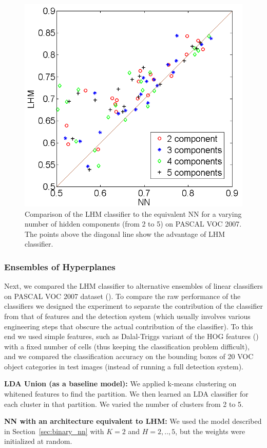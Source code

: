 \documentclass[twoside,11pt]{article}
\begin{document}
\begin{figure}[t]
\center
  \includegraphics[width=0.5\linewidth]{VOC_LHMvsNN.png}
  \caption{Comparison of the LHM classifier to the equivalent NN for a varying number of hidden components (from 2 to 5) on PASCAL VOC 2007. %
  The points above the diagonal line show the advantage of LHM classifier.}\label{fig:VOC}
\end{figure}

\subsubsection{Ensembles of Hyperplanes}\label{sec:voc_ex}
Next, we compared the LHM classifier to alternative ensembles of linear classifiers on PASCAL VOC 2007 dataset (\cite{Everingham10}).
To compare the raw performance of the classifiers we designed the experiment to separate the contribution of the classifier  from that of features and the detection system (which usually involves various engineering steps that  obscure the actual contribution of the classifier). To this end we used simple features, such as  Dalal-Triggs variant of the HOG  features (\cite{HOG}) with a fixed number of cells (thus keeping the classification problem difficult), and we compared the classification accuracy on the bounding boxes of 20 VOC object categories in test images (instead of running a full detection system).

\noindent\textbf{LDA Union (as a baseline model):} We applied k-means clustering on whitened features to find the partition. We then learned an LDA classifier for each cluster in that partition. We varied the number of clusters from 2 to 5.

\noindent\textbf{NN with an architecture equivalent to LHM:} We used the model described in Section~\ref{sec:binary_nn}  with $K=2$ and $H=2,..,5$, but the weights were initialized at random.
\end{document}
